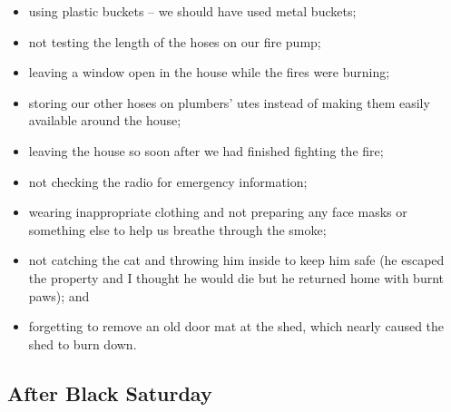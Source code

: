 \documentclass[a4paper]{article}
\begin{document}
    \begin{itemize}
        \item using plastic buckets – we should have used metal buckets;
        \item not testing the length of the hoses on our fire pump;
        \item leaving a window open in the house while the fires were burning;
        \item storing our other hoses on plumbers' utes instead of making them easily available around the house;
        \item leaving the house so soon after we had finished fighting the fire;
        \item not checking the radio for emergency information;
        \item wearing inappropriate clothing and not preparing any face masks or something else to help us breathe through the smoke;
        \item not catching the cat and throwing him inside to keep him safe (he escaped the property and I thought he would die but he returned home with burnt paws); and
        \item forgetting to remove an old door mat at the shed, which nearly caused the shed to burn down.
    \end{itemize}
\subsection{After Black Saturday}
\end{document}

